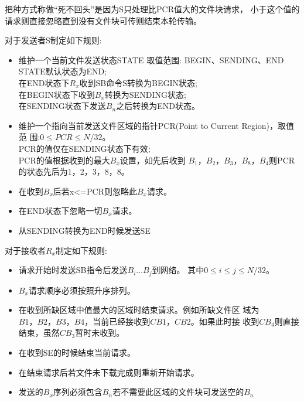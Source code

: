 把种方式称做``死不回头''是因为S只处理比PCR值大的文件块请求，
小于这个值的请求则直接忽略直到没有文件块可传则结束本轮传输。

对于发送者S制定如下规则:
\begin{itemize}
	\item
		维护一个当前文件发送状态STATE 取值范围: BEGIN、SENDING、END
		STATE默认状态为END; \\
		在END状态下$R_x$收到SB命令S转换为BEGIN状态;\\
		在BEGIN状态下收到$B_x$转换为SENDING状态; \\
		在SENDING状态下发送$B_n$之后转换为END状态。
	\item 维护一个指向当前发送文件区域的指针PCR(Point to Current Region)，取值范
		围:$0\leq PCR\leq N/32$。\\
		PCR的值仅在SENDING状态下有效; \\
		PCR的值根据收到的最大$B_x$设置，如先后收到
		$B_1，B_2，B_3，B_8，B_4$则PCR的状态先后为1，2，3，8，8。
	\item 在收到$B_x$后若x<=PCR则忽略此$B_x$请求。
	\item 在END状态下忽略一切$B_x$请求。
	\item 从SENDING转换为END时候发送SE
\end{itemize}


对于接收者$R_x$制定如下规则:
\begin{itemize}
	\item 请求开始时发送SB指令后发送$B_i\ldots B_j$到网络。
		其中$0 \leq i \le j \leq N/32$。
	\item $B_x$请求顺序必须按照升序排列。
	\item 在收到所缺区域中值最大的区域时结束请求。例如所缺文件区
		域为$B1，B2，B3，B4$，当前已经接收到$CB1，CB2$。如果此时接
		收到$CB_4$则直接结束，虽然$CB_3$暂时未收到。

	\item 在收到SE的时候结束当前请求。
	\item 在结束请求后若文件未下载完成则重新开始请求。
	\item 发送的$B_x$序列必须包含$B_n$若不需要此区域的文件块可发送空的$B_n$
\end{itemize}

